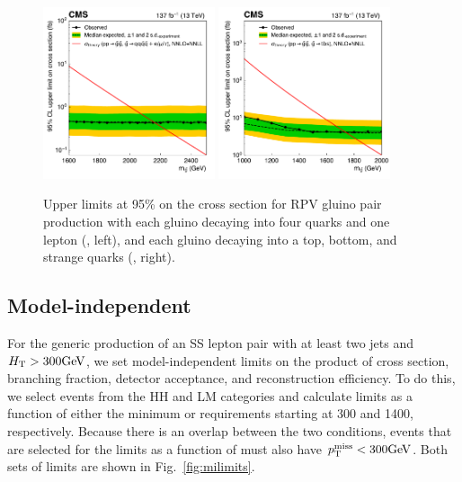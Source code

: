 \begin{figure}[!hbtp]
\centering
    \includegraphics[width=0.45\textwidth]{figs/ssp/scan_rpv_t1qqqql.pdf}
\includegraphics[width=0.45\textwidth]{figs/ssp/scan_rpv_t1tbs.pdf}\\
\caption{
          Upper limits at 95\% \CL on the cross section for RPV gluino pair production with each gluino decaying into four quarks and one lepton (\ToqqqqL, left), and
    each gluino decaying into a top, bottom, and strange quarks (\Totbs, right).
    }
\label{fig:rpvlimits}
\end{figure}

\FloatBarrier

\subsection{Model-independent}

For the generic production of an SS lepton pair with at least two jets and
$H_{\mathrm{T}}>300\text{GeV}$, we set model-independent limits on the product of cross section, branching fraction,
detector acceptance, and reconstruction efficiency.
To do this, we select events from the HH and LM categories and calculate limits
as a function of either the minimum \ptmiss or \HT requirements starting at 
300 and 1400\GeV, respectively. Because there is an overlap between the two conditions,
events that are selected for the limits as a function of \HT must also have 
$p_{\mathrm{T}}^\text{miss}<300\text{GeV}$. Both sets of limits are shown in Fig.~\ref{fig:milimits}.

